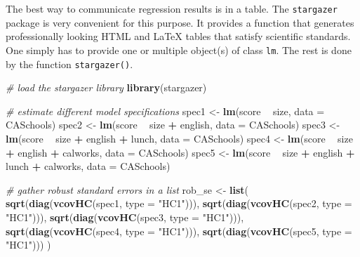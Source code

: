 \documentclass[]{book}
\newenvironment{Shaded}{\begin{snugshade}}{\end{snugshade}}
\newcommand{\KeywordTok}[1]{\textcolor[rgb]{0.13,0.29,0.53}{\textbf{#1}}}
\newcommand{\DataTypeTok}[1]{\textcolor[rgb]{0.13,0.29,0.53}{#1}}
\newcommand{\StringTok}[1]{\textcolor[rgb]{0.31,0.60,0.02}{#1}}
\newcommand{\CommentTok}[1]{\textcolor[rgb]{0.56,0.35,0.01}{\textit{#1}}}
\newcommand{\OperatorTok}[1]{\textcolor[rgb]{0.81,0.36,0.00}{\textbf{#1}}}
\newcommand{\NormalTok}[1]{#1}
\theoremstyle{definition}
\theoremstyle{definition}
\theoremstyle{definition}
\theoremstyle{remark}
\begin{document}
The best way to communicate regression results is in a table. The
\texttt{stargazer} package is very convenient for this purpose. It
provides a function that generates professionally looking HTML and LaTeX
tables that satisfy scientific standards. One simply has to provide one
or multiple object(s) of class \texttt{lm}. The rest is done by the
function \texttt{stargazer()}.

\begin{Shaded}
\begin{Highlighting}[]
\CommentTok{# load the stargazer library}
\KeywordTok{library}\NormalTok{(stargazer)}

\CommentTok{# estimate different model specifications}
\NormalTok{spec1 <-}\StringTok{ }\KeywordTok{lm}\NormalTok{(score }\OperatorTok{~}\StringTok{ }\NormalTok{size, }\DataTypeTok{data =}\NormalTok{ CASchools)}
\NormalTok{spec2 <-}\StringTok{ }\KeywordTok{lm}\NormalTok{(score }\OperatorTok{~}\StringTok{ }\NormalTok{size }\OperatorTok{+}\StringTok{ }\NormalTok{english, }\DataTypeTok{data =}\NormalTok{ CASchools)}
\NormalTok{spec3 <-}\StringTok{ }\KeywordTok{lm}\NormalTok{(score }\OperatorTok{~}\StringTok{ }\NormalTok{size }\OperatorTok{+}\StringTok{ }\NormalTok{english }\OperatorTok{+}\StringTok{ }\NormalTok{lunch, }\DataTypeTok{data =}\NormalTok{ CASchools)}
\NormalTok{spec4 <-}\StringTok{ }\KeywordTok{lm}\NormalTok{(score }\OperatorTok{~}\StringTok{ }\NormalTok{size }\OperatorTok{+}\StringTok{ }\NormalTok{english }\OperatorTok{+}\StringTok{ }\NormalTok{calworks, }\DataTypeTok{data =}\NormalTok{ CASchools)}
\NormalTok{spec5 <-}\StringTok{ }\KeywordTok{lm}\NormalTok{(score }\OperatorTok{~}\StringTok{ }\NormalTok{size }\OperatorTok{+}\StringTok{ }\NormalTok{english }\OperatorTok{+}\StringTok{ }\NormalTok{lunch }\OperatorTok{+}\StringTok{ }\NormalTok{calworks, }\DataTypeTok{data =}\NormalTok{ CASchools)}

\CommentTok{# gather robust standard errors in a list}
\NormalTok{rob_se <-}\StringTok{ }\KeywordTok{list}\NormalTok{(}
  \KeywordTok{sqrt}\NormalTok{(}\KeywordTok{diag}\NormalTok{(}\KeywordTok{vcovHC}\NormalTok{(spec1, }\DataTypeTok{type =} \StringTok{"HC1"}\NormalTok{))),}
  \KeywordTok{sqrt}\NormalTok{(}\KeywordTok{diag}\NormalTok{(}\KeywordTok{vcovHC}\NormalTok{(spec2, }\DataTypeTok{type =} \StringTok{"HC1"}\NormalTok{))),}
  \KeywordTok{sqrt}\NormalTok{(}\KeywordTok{diag}\NormalTok{(}\KeywordTok{vcovHC}\NormalTok{(spec3, }\DataTypeTok{type =} \StringTok{"HC1"}\NormalTok{))),}
  \KeywordTok{sqrt}\NormalTok{(}\KeywordTok{diag}\NormalTok{(}\KeywordTok{vcovHC}\NormalTok{(spec4, }\DataTypeTok{type =} \StringTok{"HC1"}\NormalTok{))),}
  \KeywordTok{sqrt}\NormalTok{(}\KeywordTok{diag}\NormalTok{(}\KeywordTok{vcovHC}\NormalTok{(spec5, }\DataTypeTok{type =} \StringTok{"HC1"}\NormalTok{)))}
\NormalTok{)}


\end{Highlighting}
\end{Shaded}
\end{document}
